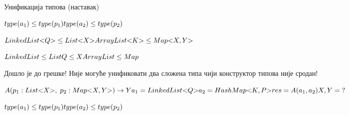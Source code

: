 \documentclass[xcolor=table]{beamer}
\begin{document}
\begin{frame}[allowframebreaks]{Унификација типова (наставак)}
        \framebreak
        
        \begin{math}
type(a_1) \leq type(p_1)
\newline
type(a_2) \leq type(p_2)
\newline
        \end{math}
        
        \framebreak
        
        \begin{math}
LinkedList\mathord{<}Q\mathord{>} \leq List\mathord{<}X\mathord{>}
\newline
ArrayList\mathord{<}K\mathord{>} \leq Map\mathord{<}X, Y\mathord{>}
        \end{math}
        
        \framebreak
        
        \begin{math}
LinkedList \leq List
\newline
Q \leq X
\newline
ArrayList \leq Map
\newline
        \end{math}
        
        Дошло је до грешке!
        \newline\newline
        Није могуће унификовати два сложена типа чији конструктор типова није сродан!
        
        \framebreak
        
        \begin{math}
A(p_1: List\mathord{<}X\mathord{>},\;p_2: Map\mathord{<}X, Y\mathord{>})\to Y
\newline
a_1 = LinkedList\mathord{<}Q\mathord{>}
\newline
a_2 = HashMap\mathord{<}K, P\mathord{>}
\newline
\newline
res = A(a_1, a_2)
\newline
X, Y = \;?
        \end{math}
        
        \framebreak
        
        \begin{math}
type(a_1) \leq type(p_1)
\newline
type(a_2) \leq type(p_2)
\newline
        \end{math}
        
        \framebreak
        

\end{frame}
\end{document}
